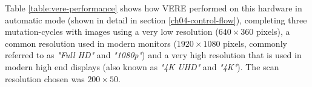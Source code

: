 Table \ref{table:vere-performance} shows how \ac{VERE} performed on this hardware in automatic mode (shown in detail in section \ref{ch04-control-flow}), completing three mutation-cycles with images using a very low resolution ($640 \times 360$ pixels), a common resolution used in modern monitors ($1920 \times 1080$ pixels, commonly referred to as \textit{"Full HD"} and \textit{"1080p"}) and a very high resolution that is used in modern high end displays (also known as \textit{"4K UHD"} and \textit{"4K"}). The scan resolution chosen was $200 \times 50$.